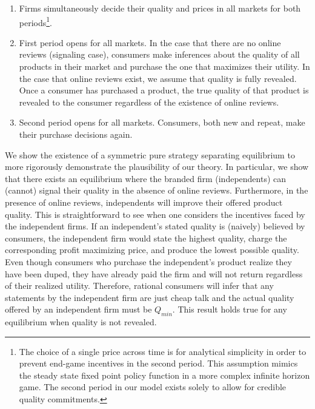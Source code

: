 \documentclass{informs_mod} %
\begin{document}
\begin{enumerate}
\item Firms simultaneously decide their quality and prices in all markets for both periods\footnote{The choice of a single price across time is for analytical simplicity in order to prevent end-game incentives in the second period. This assumption mimics the steady state fixed point policy function in a more complex infinite horizon game. The second period in our model exists solely to allow for credible quality commitments.}. 
  \item First period opens for all markets. In the case that there are no online reviews (signaling case), consumers make inferences about the quality of all products in their market and purchase the one that maximizes their utility. In the case that online reviews exist, we assume that quality is fully revealed. Once a consumer has purchased a product, the true quality of that product is revealed to the consumer regardless of the existence of online reviews.
  \item Second period opens for all markets. Consumers, both new and repeat, make their purchase decisions again.
\end{enumerate}


We show the existence of a symmetric pure strategy separating equilibrium to more rigorously demonstrate the plausibility of our theory. In particular, we show that there exists an equilibrium where the branded firm (independents) can (cannot) signal their quality in the absence of online reviews. Furthermore, in the presence of online reviews, independents will improve their offered product quality. This is straightforward  to see when one considers the incentives faced by the independent firms. If an independent's stated quality is (naively) believed by consumers, the independent firm would state the highest quality, charge the corresponding profit maximizing price, and produce the lowest possible quality. Even though consumers who purchase the independent's product realize they have been duped, they have already paid the firm and will not return regardless of their realized utility. Therefore, rational consumers will infer that any statements by the  independent firm are just cheap talk and the actual quality offered by an independent firm must be $Q_{min}$. This result holds true for any equilibrium when quality is not revealed.
\end{document}
